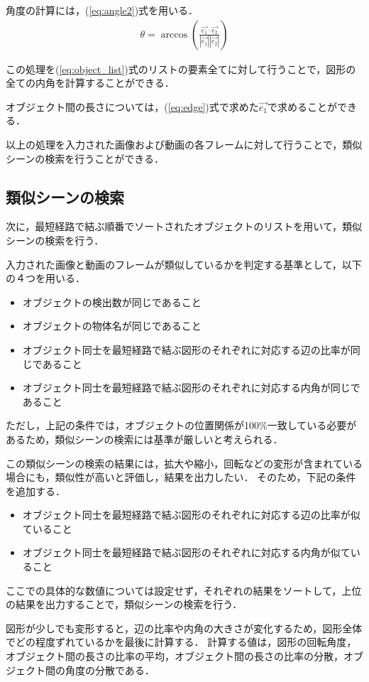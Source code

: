 \documentclass[a4j,12pt,dvipdfmx]{jreport}
\begin{document}
角度の計算には，(\ref{eq:angle2})式を用いる．
\begin{eqnarray}
  \label{eq:angle2}
  \theta = \arccos \left( \frac{\vec{e_1} \cdot \vec{e_2}}{|\vec{e_1}| |\vec{e_2}|} \right)
\end{eqnarray}

この処理を(\ref{eq:object_list})式のリストの要素全てに対して行うことで，図形の全ての内角を計算することができる．

オブジェクト間の長さについては，(\ref{eq:edge})式で求めた$\vec{e_1}$で求めることができる．


以上の処理を入力された画像および動画の各フレームに対して行うことで，類似シーンの検索を行うことができる．


\subsection{類似シーンの検索}
次に，最短経路で結ぶ順番でソートされたオブジェクトのリストを用いて，類似シーンの検索を行う．

入力された画像と動画のフレームが類似しているかを判定する基準として，以下の４つを用いる．
\begin{itemize}
  \item オブジェクトの検出数が同じであること
  \item オブジェクトの物体名が同じであること
  \item オブジェクト同士を最短経路で結ぶ図形のそれぞれに対応する辺の比率が同じであること
  \item オブジェクト同士を最短経路で結ぶ図形のそれぞれに対応する内角が同じであること
\end{itemize}

ただし，上記の条件では，オブジェクトの位置関係が100\%一致している必要があるため，類似シーンの検索には基準が厳しいと考えられる．

この類似シーンの検索の結果には，拡大や縮小，回転などの変形が含まれている場合にも，類似性が高いと評価し，結果を出力したい．
そのため，下記の条件を追加する．
\begin{itemize}
  \item オブジェクト同士を最短経路で結ぶ図形のそれぞれに対応する辺の比率が似ていること
  \item オブジェクト同士を最短経路で結ぶ図形のそれぞれに対応する内角が似ていること
\end{itemize}
ここでの具体的な数値については設定せず，それぞれの結果をソートして，上位の結果を出力することで，類似シーンの検索を行う．

図形が少しでも変形すると，辺の比率や内角の大きさが変化するため，図形全体でどの程度ずれているかを最後に計算する．
計算する値は，図形の回転角度，オブジェクト間の長さの比率の平均，オブジェクト間の長さの比率の分散，オブジェクト間の角度の分散である．
\end{document}
